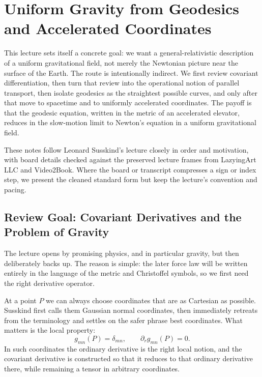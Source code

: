 \chapter{Uniform Gravity from Geodesics and Accelerated Coordinates}

This lecture sets itself a concrete goal: we want a general-relativistic description of a uniform gravitational field, not merely the Newtonian picture near the surface of the Earth. The route is intentionally indirect. We first review covariant differentiation, then turn that review into the operational notion of parallel transport, then isolate geodesics as the straightest possible curves, and only after that move to spacetime and to uniformly accelerated coordinates. The payoff is that the geodesic equation, written in the metric of an accelerated elevator, reduces in the slow-motion limit to Newton's equation in a uniform gravitational field.

These notes follow Leonard Susskind's lecture closely in order and motivation, with board details checked against the preserved lecture frames from LazyingArt LLC and Video2Book. Where the board or transcript compresses a sign or index step, we present the cleaned standard form but keep the lecture's convention and pacing.

\section{Review Goal: Covariant Derivatives and the Problem of Gravity}

The lecture opens by promising physics, and in particular gravity, but then deliberately backs up. The reason is simple: the later force law will be written entirely in the language of the metric and Christoffel symbols, so we first need the right derivative operator.

At a point \(P\) we can always choose coordinates that are as Cartesian as possible. Susskind first calls them Gaussian normal coordinates, then immediately retreats from the terminology and settles on the safer phrase best coordinates. What matters is the local property:
\begin{equation}
g_{mn}(P)=\delta_{mn},
\qquad
\partial_r g_{mn}(P)=0.
\end{equation}
In such coordinates the ordinary derivative is the right local notion, and the covariant derivative is constructed so that it reduces to that ordinary derivative there, while remaining a tensor in arbitrary coordinates.

